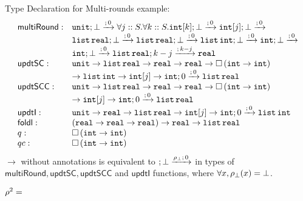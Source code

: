 Type Declaration for Multi-rounds example:
\[
\begin{array}{ll} 
  \mathsf{multiRound} 
  :
    &
    \tarr{\tunit}
    {
      \forall j:: S. \forall k:: S.
      \tarr{\tint[k]}
      {
        \tarr{\tint[j]}
        {
          \empty
        }{\bot}{}{0}
      }{\bot}{}{0}
    }{\bot}{}{0} \\
    &
    \tarr{\tlist{\treal}}
    {
      \tarr{\tlist{\treal}}
      {
        \tarr{\tlist{\tint}}
        {
          \tarr{\tint}
          {
            \empty
          }{\bot}{}{0}
        }{\bot}{}{0} 
      }{\bot}{}{0}
    }{\bot}{}{0}\\
    &
    \tarr{\tint}
    {
      \tarr{\tlist{\treal}}
      {
        \treal
      }{k - j}{}{k - j}
    }{\bot}{}{0}\\

  \mathsf{updtSC} : 
    & \tunit \to \tlist{\treal} \to \treal \to \treal \to \tbox{ \tint \to \tint } \\       
    & \to \tlist{\tint} \to \tint[j] \to \tarr{\tint}{\tlist{\treal}}{0}{}{0}\\
  \mathsf{updtSCC} : 
    & \tunit \to \tlist{\treal} \to \treal \to \treal \to \tbox{ \tint \to \tint } \\
    & \to \tint[j] \to \tarr{\tint}{\tlist{\treal}}{0}{}{0}\\
  \mathsf{updtI} : & \tunit \to \treal \to \tlist{\treal} \to \tint[j] \to \tarr{\tint}{\tlist{\tint}}{0}{}{0}\\
  \mathsf{foldl} : & (\treal \to \treal \to \treal) \to \treal \to \tlist{\treal}\\
  q :              & \tbox{\tint \to \tint}\\
  qc :             & \tbox{\tint \to \tint}\\
\end{array}
\]
$\to$ without annotations is equivalent to $; \bot \xrightarrow{\rho_{\bot}; \, 0}$ in types of $\mathsf{multiRound}, \mathsf{updtSC}, \mathsf{updtSCC}$ and $ \mathsf{updtI} $ functions, where $\forall x, \rho_{\bot}(x) = \bot$.

$\rho^2 = $

